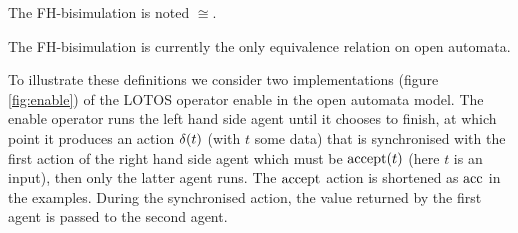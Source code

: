 \documentclass{article}
\begin{document}
\begin{noti}[FH-bisimulation]
The FH-bisimulation \cite{henrio:01055091} is noted \(\cong\).



The FH-bisimulation is currently the only equivalence relation on open automata.
\end{noti}
To illustrate these definitions we consider two implementations (figure \ref{fig:enable}) of the LOTOS \cite{ISOLOTOS} operator enable in the open automata model.
The enable operator runs the left hand side agent until it chooses to finish, at which point it produces an action \(\delta{\left(t\right)}\) (with \(t\) some data) that is synchronised with the first action of the right hand side agent which must be \(\mathrm{accept}{\left(t\right)}\) (here \(t\) is an input), then only the latter agent runs.
The \(\mathrm{accept}\) action is shortened as \(\mathrm{acc}\) in the examples.
During the synchronised action, the value returned by the first agent is passed to the second agent.
\end{document}
